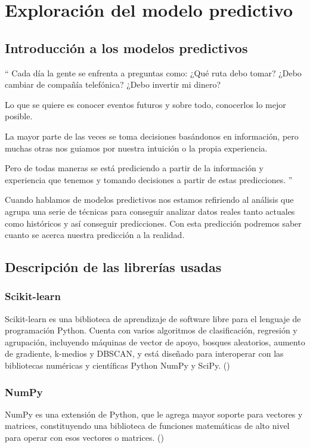 \cleardoublepage

\chapter{Exploración del modelo predictivo}
\label{makereference4}

\section{Introducción a los modelos predictivos}
\label{makereference4.1}

 `` Cada día la gente se enfrenta a preguntas como: ¿Qué ruta debo tomar? ¿Debo cambiar de compañía telefónica? ¿Debo invertir mi dinero?
 
Lo que se quiere es conocer eventos futuros y sobre todo, conocerlos lo mejor posible.

La mayor parte de las veces se toma decisiones basándonos en información, pero muchas otras nos guiamos por nuestra intuición o la propia experiencia.

Pero de todas maneras se está prediciendo a partir de la información y experiencia que tenemos y tomando decisiones a partir de estas predicciones. '' 


Cuando hablamos de modelos predictivos nos estamos refiriendo al análisis que agrupa una serie de técnicas para conseguir analizar datos reales tanto actuales como históricos y así conseguir predicciones. Con esta predicción podremos saber cuanto se acerca nuestra predicción a la realidad.

 

\section{Descripción de las librerías usadas}
\label{makereference4.2}
	\subsection{Scikit-learn}
	\label{makereference4.2.1}
	Scikit-learn es una biblioteca de aprendizaje de software libre para el lenguaje de programación Python. Cuenta con varios algoritmos de clasificación, regresión y agrupación, incluyendo máquinas de vector de apoyo, bosques aleatorios, aumento de gradiente, k-medios y DBSCAN, y está diseñado para interoperar con las bibliotecas numéricas y científicas Python NumPy y SciPy. (\cite{ARP:Scikit:2017})
	
	\subsection{NumPy}
	\label{makereference4.2.2}
	NumPy es una extensión de Python, que le agrega mayor soporte para vectores y matrices, constituyendo una biblioteca de funciones matemáticas de alto nivel para operar con esos vectores o matrices. (\cite{ARP:Numpy:2017})
	
